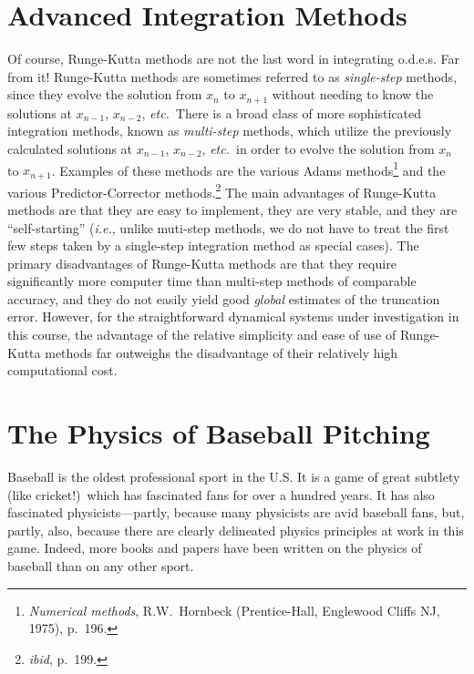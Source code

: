 \section{Advanced Integration Methods}
Of course, Runge-Kutta methods are not the last word in integrating o.d.e.s. Far from
it! Runge-Kutta methods are sometimes referred to as {\em single-step}\/ methods,
since they evolve the solution from $x_n$ to $x_{n+1}$ without needing to
know the solutions at $x_{n-1}$, $x_{n-2}$, {\em etc.}\ There is a broad
class of more sophisticated integration methods, known as {\em multi-step}\/ methods,
which utilize the previously calculated solutions at $x_{n-1}$, $x_{n-2}$, 
{\em etc.}\
in order to evolve the solution from  $x_n$ to $x_{n+1}$. Examples of these
methods are the various Adams methods\footnote{{\em Numerical methods},
R.W.~Hornbeck
(Prentice-Hall, Englewood Cliffs NJ, 1975), p.~196.} and the various Predictor-Corrector
methods.\footnote{{\em ibid},  p.~199.} The main advantages of
Runge-Kutta methods are that they are easy to implement,  they are very stable,
and  they are ``self-starting'' ({\em i.e.}, unlike muti-step methods, we do not
have to treat the first few steps taken by a single-step integration method as special cases). 
The primary disadvantages of Runge-Kutta methods are that they require significantly
more computer time than multi-step methods of comparable accuracy, and 
 they do not easily yield good {\em global}\/ estimates of the truncation error. However, for the straightforward
dynamical systems under investigation in this course, the advantage of the relative simplicity and
ease of use of Runge-Kutta methods far outweighs the disadvantage of their
relatively high computational cost.

\section{The Physics of Baseball Pitching}
Baseball is the oldest professional sport in the U.S. It is
a
game of great subtlety (like cricket!)\ which has fascinated fans
for over a hundred years. It has also fascinated physicists---partly, 
because many physicists are avid baseball fans, but, partly,
also, because there are clearly delineated physics principles at work in this game. Indeed,
more books and papers have been written on the physics of baseball than on 
 any
other sport. 

